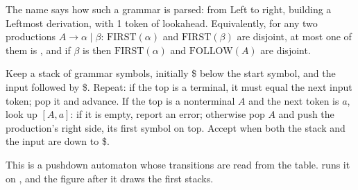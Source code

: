 The name says how such a grammar is parsed: from Left to right, building a Leftmost derivation, with 1 token of lookahead. Equivalently, for any two productions $A \to \alpha \mid \beta$: $\mathrm{FIRST}(\alpha)$ and $\mathrm{FIRST}(\beta)$ are disjoint, at most one of them is , and if $\beta$ is  then $\mathrm{FIRST}(\alpha)$ and $\mathrm{FOLLOW}(A)$ are disjoint.

\begin{method}\label{met:b3:top-down-parsing:predictive}
Keep a stack of grammar symbols, initially \$ below the start symbol, and the input followed by \$. Repeat: if the top is a terminal, it must equal the next input token; pop it and advance. If the top is a nonterminal $A$ and the next token is $a$, look up $[A, a]$: if it is empty, report an error; otherwise pop $A$ and push the production's right side, its first symbol on top. Accept when both the stack and the input are down to \$.
\end{method}

This is a pushdown automaton whose transitions are read from the table.  runs it on , and the figure after it draws the first stacks.

\label{out:b3:top-down-parsing:driver}

\begin{omfigure}
\par{}
\end{omfigure}

